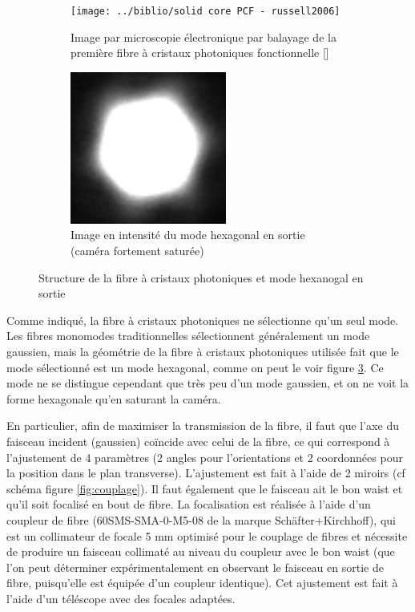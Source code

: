 \documentclass[11pt,a4paper] { article}
\newcommand{\ncite}[1]{[\citenum{#1}]}
\begin{document}
\begin{figure}[htpb] 
\centering
\hspace*{0.4cm}
\begin{subfigure}[h]{0.48\textwidth}
	\centering
	\texttt{[image: ../biblio/solid core PCF - russell2006]}
	\caption{Image par microscopie électronique par balayage de la première fibre à cristaux photoniques fonctionnelle \ncite{russell2006}}
	\label{fig:PCF}
\end{subfigure}
\begin{subfigure}[h]{0.48\textwidth}
	\centering
	\includegraphics[height=5cm]{./img/mode hexa.png}
	\caption{Image en intensité du mode hexagonal en sortie (caméra fortement saturée)}
	\label{fig:hexa}
\end{subfigure}
\hspace*{-0.8cm}
\caption{Structure de la fibre à cristaux photoniques et mode hexanogal en sortie}
\end{figure}

Comme indiqué, la fibre à cristaux photoniques ne sélectionne qu'un seul mode. Les fibres monomodes traditionnelles sélectionnent généralement un mode gaussien, mais la géométrie de la fibre à cristaux photoniques utilisée fait que le mode sélectionné est un mode hexagonal, comme on peut le voir figure \ref{fig:hexa}. Ce mode ne se distingue cependant que très peu d'un mode gaussien, et on ne voit la forme hexagonale qu'en saturant la caméra.

En particulier, afin de maximiser la transmission de la fibre, il faut que l'axe du faisceau incident (gaussien) coïncide avec celui de la fibre, ce qui correspond à l'ajustement de 4 paramètres (2 angles pour l'orientations et 2 coordonnées pour la position dans le plan transverse). L'ajustement est fait à l'aide de 2 miroirs (cf schéma figure \ref{fig:couplage}). Il faut également que le faisceau ait le bon waist et qu'il soit focalisé en bout de fibre. La focalisation est réalisée à l'aide d'un coupleur de fibre (60SMS-SMA-0-M5-08 de la marque Schäfter+Kirchhoff), qui est un collimateur de focale 5 mm optimisé pour le couplage de fibres et nécessite de produire un faisceau collimaté au niveau du coupleur avec le bon waist (que l'on peut déterminer expérimentalement en observant le faisceau en sortie de fibre, puisqu'elle est équipée d'un coupleur identique). Cet ajustement est fait à l'aide d'un téléscope avec des focales adaptées.
\end{document}

